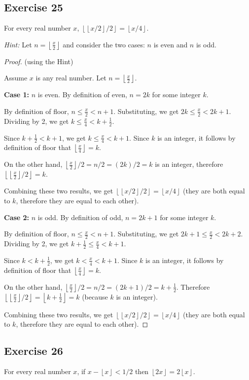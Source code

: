\documentclass[14pt]{extarticle}
\newcommand{\floor}[1]{{\left\lfloor#1\right\rfloor}}
\begin{document}
\subsection{Exercise 25}
For every real number $x$, $\floor{\floor{x/2}/2} = \floor{x/4}$.

    {\it Hint:} Let $n = \floor{\frac{x}{2}}$ and consider the two cases: $n$ is even and $n$ is odd.

\begin{proof}
    (using the Hint)

    Assume $x$ is any real number. Let $n = \floor{\frac{x}{2}}$.

        {\bf Case 1:} $n$ is even. By definition of even, $n = 2k$ for some integer $k$.

    By definition of floor, $n \leq \frac{x}{2} < n+1$. Substituting, we get $2k \leq \frac{x}{2} < 2k+1$.
    Dividing by 2, we get $k \leq \frac{x}{4} < k+\frac{1}{2}$.

    Since $k + \frac{1}{2} < k + 1$, we get $k \leq \frac{x}{4} < k+1$. Since $k$ is an integer, it follows by definition of floor that $\floor{\frac{x}{4}} = k$.

    On the other hand, $\floor{\frac{x}{2}}/2 = n/2 = (2k)/2 = k$ is an integer, therefore $\floor{\floor{\frac{x}{2}}/2} = k$.

    Combining these two results, we get $\floor{\floor{x/2}/2} = \floor{x/4}$ (they are both equal to $k$, therefore they are equal to each other).

        {\bf Case 2:} $n$ is odd. By definition of odd, $n = 2k+1$ for some integer $k$.

    By definition of floor, $n \leq \frac{x}{2} < n+1$. Substituting, we get $2k+1 \leq \frac{x}{2} < 2k+2$.
    Dividing by 2, we get $k+\frac{1}{2} \leq \frac{x}{4} < k + 1$.

    Since $k < k + \frac{1}{2}$, we get $k < \frac{x}{4} < k+1$. Since $k$ is an integer, it follows by definition of floor that $\floor{\frac{x}{4}} = k$.

    On the other hand, $\floor{\frac{x}{2}}/2 = n/2 = (2k+1)/2 = k + \frac{1}{2}$. Therefore $\floor{\floor{\frac{x}{2}}/2} = \floor{k + \frac{1}{2}} = k$ (because $k$ is an integer).

    Combining these two results, we get $\floor{\floor{x/2}/2} = \floor{x/4}$ (they are both equal to $k$, therefore they are equal to each other).
\end{proof}

\subsection{Exercise 26}
For every real number $x$, if $x - \floor{x} < 1/2$ then $\floor{2x} = 2\floor{x}$.
\end{document}
